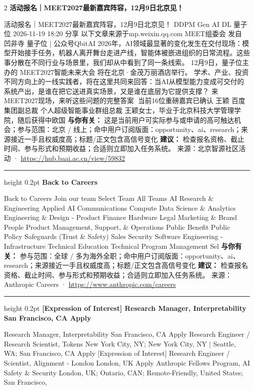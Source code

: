 \documentclass[10.5pt]{ctexart}
\begin{document}
\begin{multicols}{2}
{\large\bfseries 活动报名｜MEET2027最新嘉宾阵容，12月9日北京见！}\par
活动报名｜MEET2027最新嘉宾阵容，12月9日北京见！ DDPM Gen AI DL 量子位 2026-11-19 18:20 分享 以下文章来源于mp.weixin.qq.com MEET组委会 发自 凹非寺 量子位 | 公众号QbitAI 2026年，AI领域最显著的变化发生在交付现场：模型开始接手任务，机器人离开舞台走进产线，智能体被嵌进组织的日常流程。这些事分散在不同行业与场景里，我们却从中看到了同一条线索。 12月9日，量子位主办的 MEET2027智能未来大会 将在北京·金茂万丽酒店举行。 学术、产业、投资 不同方向上的一线实践者，将在这里共同来回答：当AI从模型能力变成可交付的系统产出，是谁在把它送进真实场景，又是谁在底层为它提供支撑？ 来MEET2027现场，来听这些问题的完整答案🔽 当前16位重磅嘉宾已确认 王颖 百度集团副总裁 个人超级智能事业群组总裁 王颖女士，毕业于北京科技大学管理学院，随后获得中欧国
\textbf{与你有关：} 这是当前用户可实际参与或申请的高可触达机会；参与范围：北京 / 线上；命中用户订阅版面：opportunity、ai、research；来源接近一手且权威度高；标题/正文包含高信号变化
\textbf{建议：} 检查报名资格、截止时间、参与形式和预期收益；合适则立即加入任务系统。
{\footnotesize\color{ormuted} 来源：北京智源社区活动 · \url{https://hub.baai.ac.cn/view/59832}}
\vspace{2mm}
\hrule height 0.2pt
\vspace{2mm}
{\large\bfseries Back to Careers}\par
Back to Careers Join our team Select Team All Teams AI Research \& Engineering Applied AI Communications Compute Data Science \& Analytics Engineering \& Design - Product Finance Hardware Legal Marketing \& Brand People Product Management, Support, \& Operations Public Benefit Public Policy Safeguards (Trust \& Safety) Sales Security Software Engineering - Infrastructure Technical Education Technical Program Management Sel
\textbf{与你有关：} 参与范围：全球 / 多为海外全职；命中用户订阅版面：opportunity、ai、research；来源接近一手且权威度高；标题/正文包含高信号变化
\textbf{建议：} 检查报名资格、截止时间、参与形式和预期收益；合适则立即加入任务系统。
{\footnotesize\color{ormuted} 来源：Anthropic Careers · \url{https://www.anthropic.com/careers}}
\vspace{2mm}
\hrule height 0.2pt
\vspace{2mm}
{\large\bfseries [Expression of Interest] Research Manager, Interpretability San Francisco, CA Apply}\par
[Expression of Interest] Research Manager, Interpretability San Francisco, CA Apply Research Engineer / Research Scientist, Tokens New York City, NY; New York City, NY | Seattle, WA; San Francisco, CA Apply [Expression of Interest] Research Engineer / Scientist, Alignment - London London, UK Apply Anthropic Fellows Program, AI Safety \& Security London, UK; Ontario, CAN; Remote-Friendly, United States; San Francisco, 

\end{multicols}
\end{document}

